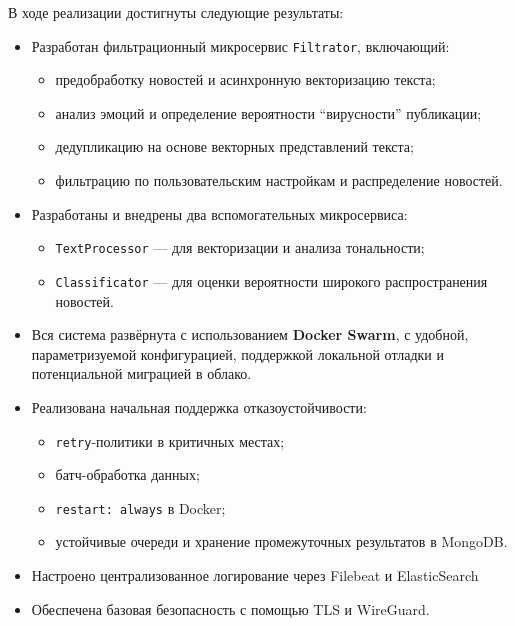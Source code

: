 В ходе реализации достигнуты следующие результаты:

\begin{itemize}
\tightlist
\item
  Разработан фильтрационный микросервис \texttt{Filtrator}, включающий:

  \begin{itemize}
  \tightlist
  \item
    предобработку новостей и асинхронную векторизацию текста;\\
  \item
    анализ эмоций и определение вероятности ``вирусности'' публикации;\\
  \item
    дедупликацию на основе векторных представлений текста;\\
  \item
    фильтрацию по пользовательским настройкам и распределение
    новостей.\\
  \end{itemize}
\item
  Разработаны и внедрены два вспомогательных микросервиса:

  \begin{itemize}
  \tightlist
  \item
    \texttt{TextProcessor} --- для векторизации и анализа тональности;\\
  \item
    \texttt{Classificator} --- для оценки вероятности широкого
    распространения новостей.\\
  \end{itemize}
\item
  Вся система развёрнута с использованием \textbf{Docker Swarm}, с
  удобной, параметризуемой конфигурацией, поддержкой локальной отладки и
  потенциальной миграцией в облако.\\
\item
  Реализована начальная поддержка отказоустойчивости:

  \begin{itemize}
  \tightlist
  \item
    \texttt{retry}-политики в критичных местах;\\
  \item
    батч-обработка данных;\\
  \item
    \texttt{restart:\ always} в Docker;\\
  \item
    устойчивые очереди и хранение промежуточных результатов в MongoDB.\\
  \end{itemize}
\item
  Настроено централизованное логирование через Filebeat и
  ElasticSearch\\
\item
  Обеспечена базовая безопасность с помощью TLS и WireGuard.
\end{itemize}

